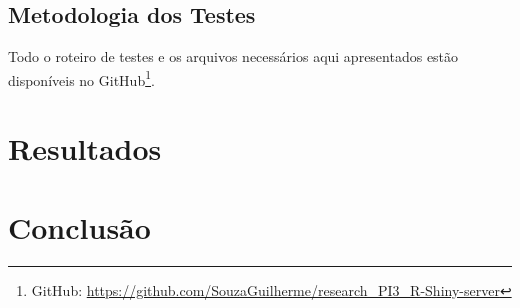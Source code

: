\documentclass[12pt,english,brazil]{article}
\begin{document}
\subsection{Metodologia dos Testes}\label{sec:MetodologiaDosTestes}

Todo o roteiro de testes e os arquivos necessários aqui apresentados estão disponíveis no GitHub\footnote{GitHub: \url{https://github.com/SouzaGuilherme/research_PI3_R-Shiny-server}}.

\section{Resultados} \label{sec:Resultados}


\section{Conclusão} \label{sec:conlusao}





\end{document}
